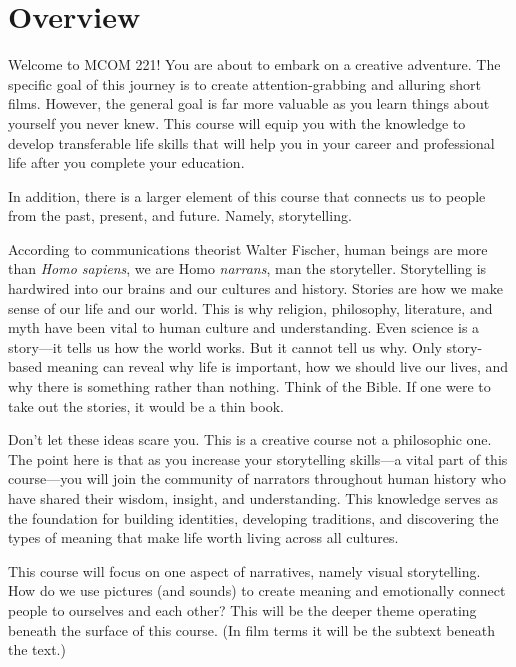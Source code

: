 \documentclass[
  letterpaper,
  DIV=11,
  numbers=noendperiod]{scrreprt}
\begin{document}
\section*{Overview}\label{overview}


Welcome to MCOM 221! You are about to embark on a creative adventure.
The specific goal of this journey is to create attention-grabbing and
alluring short films. However, the general goal is far more valuable as
you learn things about yourself you never knew. This course will equip
you with the knowledge to develop transferable life skills that will
help you in your career and professional life after you complete your
education.

In addition, there is a larger element of this course that connects us
to people from the past, present, and future. Namely, storytelling.

According to communications theorist Walter Fischer, human beings are
more than \emph{Homo sapiens}, we are Homo \emph{narrans}, man the
storyteller. Storytelling is hardwired into our brains and our cultures
and history. Stories are how we make sense of our life and our world.
This is why religion, philosophy, literature, and myth have been vital
to human culture and understanding. Even science is a story---it tells
us how the world works. But it cannot tell us why. Only story-based
meaning can reveal why life is important, how we should live our lives,
and why there is something rather than nothing. Think of the Bible. If
one were to take out the stories, it would be a thin book.

Don't let these ideas scare you. This is a creative course not a
philosophic one. The point here is that as you increase your
storytelling skills---a vital part of this course---you will join the
community of narrators throughout human history who have shared their
wisdom, insight, and understanding. This knowledge serves as the
foundation for building identities, developing traditions, and
discovering the types of meaning that make life worth living across all
cultures.

This course will focus on one aspect of narratives, namely visual
storytelling. How do we use pictures (and sounds) to create meaning and
emotionally connect people to ourselves and each other? This will be the
deeper theme operating beneath the surface of this course. (In film
terms it will be the subtext beneath the text.)
\end{document}
